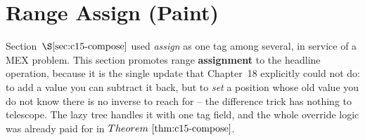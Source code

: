 \section{Range Assign (Paint)}\label{sec:c15-assign}

\begin{previouslybox}
Section~\(\secref{c15-compose}\) used \emph{assign} as one tag among several, in service of a MEX problem.  This section promotes range \textbf{assignment} to the headline operation, because it is the single update that Chapter~18 explicitly could not do: to add a value you can subtract it back, but to \emph{set} a position whose old value you do not know there is no inverse to reach for -- the difference trick has nothing to telescope.  The lazy tree handles it with one tag field, and the whole override logic was already paid for in \(\thmref{c15-compose}\).
\end{previouslybox}

